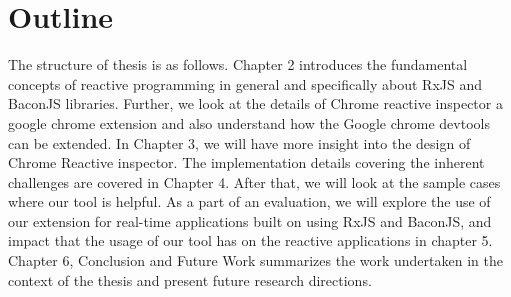 \section{Outline}

The structure of thesis is as follows. Chapter 2 introduces the fundamental concepts of reactive programming in general and specifically about RxJS and BaconJS libraries. 
Further, we look at the details of Chrome reactive inspector a google chrome extension and also understand how the Google chrome devtools can be extended. In Chapter 3, we will have more insight into the design of Chrome Reactive inspector. 
The implementation details covering the inherent challenges are covered in Chapter 4. 
After that, we will look at the sample cases where our tool is helpful. 
As a part of an evaluation, we will explore the use of our extension for real-time applications built on using RxJS and BaconJS, and impact that the usage of our tool has on the reactive applications in chapter 5. 
Chapter 6, Conclusion and Future Work summarizes the work undertaken in the context of the thesis and present future research directions.



